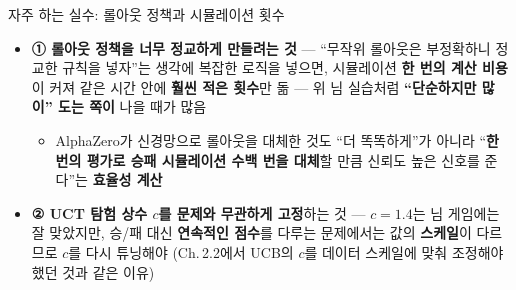 \documentclass[aspectratio=169,11pt]{beamer}
\begin{document}

\begin{frame}{자주 하는 실수: 롤아웃 정책과 시뮬레이션 횟수}
  \begin{itemize}
    \item \textbf{① 롤아웃 정책을 너무 정교하게 만들려는 것}
      --- ``무작위 롤아웃은 부정확하니 정교한 규칙을 넣자''는
      생각에 복잡한 로직을 넣으면, 시뮬레이션 \textbf{한 번의
      계산 비용}이 커져 같은 시간 안에 \textbf{훨씬 적은
      횟수}만 돎 --- 위 님 실습처럼 \textbf{``단순하지만 많이''
      도는 쪽이} 나을 때가 많음
      \begin{itemize}
        \item AlphaZero가 신경망으로 롤아웃을 대체한 것도
          ``더 똑똑하게''가 아니라 ``\textbf{한 번의 평가로
          승패 시뮬레이션 수백 번을 대체}할 만큼 신뢰도 높은
          신호를 준다''는 \textbf{효율성 계산}
      \end{itemize}
    \item \textbf{② UCT 탐험 상수 $c$를 문제와 무관하게
      고정}하는 것 --- $c=1.4$는 님 게임에는 잘 맞았지만,
      승/패 대신 \textbf{연속적인 점수}를 다루는 문제에서는
      값의 \textbf{스케일}이 다르므로 $c$를 다시 튜닝해야
      (Ch.\,2.2에서 UCB의 $c$를 데이터 스케일에 맞춰
      조정해야 했던 것과 같은 이유)
  \end{itemize}
\end{frame}
\end{document}
